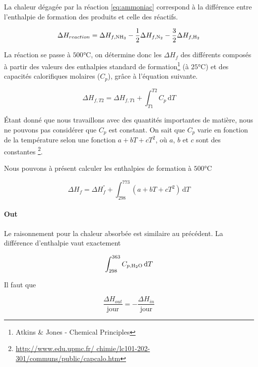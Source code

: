 \documentclass[a4paper, oneside, 12pt]{article}
\begin{document}
La chaleur dégagée par la réaction \ref{eq:ammoniac} correspond à la 
différence entre l'enthalpie de formation des produits et celle des réactifs. 

\begin{equation}
	\Delta H_{reaction} = \Delta H_{f, \ce{NH3}} 
	- \frac{1}{2} \Delta H_{f, \ce{N2}}
	- \frac{3}{2} \Delta H_{f, \ce{H2}}
	\label{eq:enthalpie_reaction}
\end{equation}

La réaction se passe à $500 \si{\degreeCelsius}$, 
on détermine donc les $\Delta H_{f}$ des différents 
composés à partir des valeurs des enthalpies standard
de formation\footnote{Atkins \& Jones - Chemical Principles}
(à $25 \si{\degreeCelsius}$)
et des capacités calorifiques molaires ($C_p$), gr\^ace 
à l'équation suivante.

\begin{equation}
	\Delta H_{f, T2} = \Delta H_{f, T1} 
	+ \int_{T1}^{T2} C_p \, \mathrm{d}T
	\label{eq:enthalpie_temp}
\end{equation}

Étant donné que nous travaillons avec des quantités importantes de matière,
nous ne pouvons pas considérer que $C_p$ est constant.
On sait que $C_p$ varie en fonction de la température 
selon une fonction $a + b T + c T^2$, 
où $a$, $b$ et $c$ sont des constantes
\footnote{\url{http://www.edu.upmc.fr/
chimie/lc101-202-301/communs/public/capcalo.htm}}. 

Nous pouvons à présent calculer les enthalpies 
de formation à $500 \si{\degreeCelsius}$

\begin{equation*}
	\Delta H_f = \Delta H_{f}^{\si{\degree}} + 
	\int_{298}^{773} (a + b T + c T^2) \, \mathrm{d}T
\end{equation*}

\paragraph{Out}

Le raisonnement pour la chaleur absorbée est similaire 
au précédent.
La différence d'enthalpie vaut exactement

\[
	\int_{298}^{363} C_{p, \ce{H2O}} \, \mathrm{d}T
\]

Il faut que

\[
	\frac{\Delta H_{out}}{\mathrm{jour}} 
	= - \frac{\Delta H_{in}}{\mathrm{jour}}
\]
\end{document}
